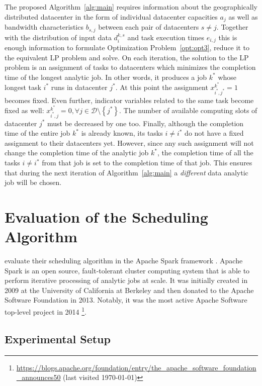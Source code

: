 The proposed Algorithm~\ref{alg:main} requires information about the geographically distributed datacenter in the form of individual datacenter capacities \(a_j\) as well as bandwidth characteristics \(b_{s, j}\) between each pair of datacenters \(s\neq j\). Together with the distribution of input data \(d^{k, s}_i\) and task execution times \(e_{i, j}\) this is enough information to formulate Optimization Problem~\ref{opt:opt3}, reduce it to the equivalent LP problem and solve. On each iteration, the solution to the LP problem is an assignment of tasks to datacenters which minimizes the completion time of the longest analytic job. In other words, it produces a job \(k^*\) whose longest task \(i^*\) runs in datacenter \(j^*\). At this point the assignment \(x^{k^*}_{i^*, j^*} = 1\) becomes fixed. Even further, indicator variables related to the same task become fixed as well: \(x^{k^*}_{i^*, j}=0, \forall j\in\mathcal{D}\setminus \left\{j^*\right\}\). The number of available computing slots of datacenter \(j^*\) must be decreased by one too. Finally, although the completion time of the entire job \(k^*\) is already known, its tasks \(i\neq i^*\) do not have a fixed assignment to their datacenters yet. However, since any such assignment will not change the completion time of the analytic job \(k^*\), the completion time of all the tasks \(i\neq i^*\) from that job is set to the completion time of that job. This ensures that during the next iteration of Algorithm~\ref{alg:main} a \emph{different} data analytic job will be chosen.

\section{Evaluation of the Scheduling Algorithm}

\citet{Chen2017} evaluate their scheduling algorithm in the Apache Spark framework \cite{Zaharia2012}. Apache Spark is an open source, fault-tolerant cluster computing system that is able to perform iterative processing of analytic jobs at scale. It was initially created in 2009 at the University of California at Berkeley and then donated to the Apache Software Foundation in 2013. Notably, it was the most active Apache Software top-level project in 2014 \footnote{\url{https://blogs.apache.org/foundation/entry/the_apache_software_foundation_announces50} (last visited \today)}.

\subsection{Experimental Setup}

